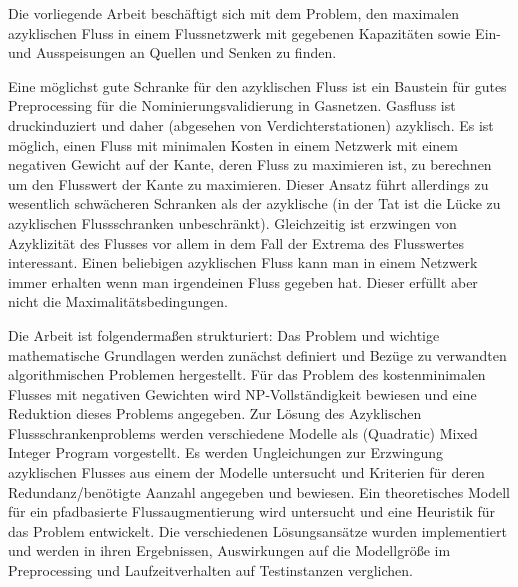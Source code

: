 Die vorliegende Arbeit beschäftigt sich mit dem Problem, den maximalen azyklischen Fluss in einem 
Flussnetzwerk mit gegebenen Kapazitäten sowie Ein- und Ausspeisungen an Quellen und Senken zu finden. 

Eine möglichst gute Schranke für den azyklischen Fluss ist ein Baustein für gutes Preprocessing 
für die Nominierungsvalidierung in Gasnetzen. Gasfluss ist druckinduziert und daher (abgesehen von Verdichterstationen) 
azyklisch. Es ist möglich, einen Fluss mit minimalen Kosten in einem Netzwerk mit einem negativen Gewicht auf der 
Kante, deren Fluss zu maximieren ist, zu berechnen um den Flusswert der Kante zu maximieren. Dieser Ansatz führt 
allerdings zu wesentlich schwächeren Schranken als der azyklische (in der Tat ist 
die Lücke zu azyklischen Flussschranken unbeschränkt). Gleichzeitig ist erzwingen von Azyklizität des Flusses vor allem 
in dem Fall der Extrema des Flusswertes interessant. Einen beliebigen azyklischen Fluss kann man in einem Netzwerk 
immer erhalten wenn man irgendeinen Fluss gegeben hat. Dieser erfüllt aber nicht die Maximalitätsbedingungen.


Die Arbeit ist folgendermaßen strukturiert: Das Problem und wichtige mathematische Grundlagen werden zunächst definiert 
und Bezüge zu verwandten algorithmischen Problemen hergestellt. 
Für das Problem des kostenminimalen Flusses mit negativen Gewichten wird NP-Vollständigkeit bewiesen und eine Reduktion 
dieses Problems angegeben. 
Zur Lösung des Azyklischen Flussschrankenproblems werden verschiedene Modelle als (Quadratic) 
Mixed Integer Program vorgestellt. Es werden Ungleichungen zur Erzwingung azyklischen Flusses aus einem der Modelle 
untersucht und Kriterien für deren Redundanz/benötigte Aanzahl angegeben und bewiesen. Ein theoretisches Modell für ein 
pfadbasierte Flussaugmentierung wird untersucht und eine Heuristik für das Problem entwickelt.
Die verschiedenen Lösungsansätze wurden implementiert und werden in ihren Ergebnissen, Auswirkungen auf
die Modellgröße im Preprocessing und Laufzeitverhalten auf Testinstanzen verglichen.